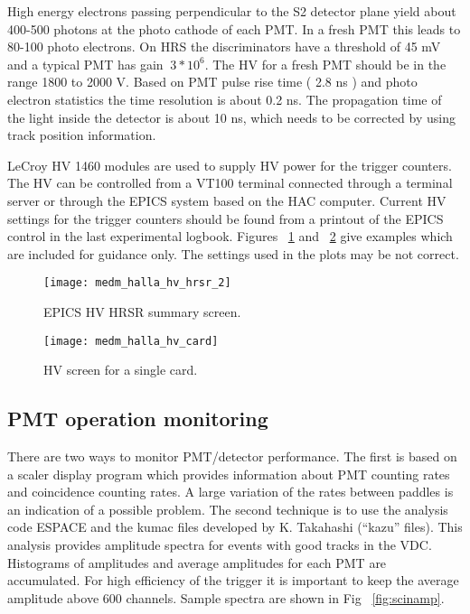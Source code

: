 High energy electrons passing perpendicular to the S2 detector
plane yield about 400-500 photons at the photo cathode of each
PMT. In a fresh PMT this leads to 80-100 
photo electrons. On HRS the discriminators have a threshold of 45
mV and a typical 
PMT has gain $~ 3*10^6$. The HV for a fresh PMT should be in the
range 1800 to 2000 V. Based on PMT pulse 
rise time ( 2.8 ns ) and photo electron statistics the time
resolution is about 0.2 ns. 
The propagation time of the light inside the detector is about 10 ns,
which needs to be corrected by using track position information. 

LeCroy HV 1460 modules are used to supply HV power for the
trigger counters. The HV can be controlled from 
a VT100 terminal connected through a terminal server or through
the EPICS system based on the HAC computer. 
Current HV settings for the trigger counters should be found from
a printout of the EPICS control in the 
last experimental logbook.   
Figures ~\ref{fig:scinhv} and ~\ref{fig:s1scinhvc} give examples
which are included for guidance only. The settings used in the
plots may be not correct.

\begin{figure}[p]
\begin{center}
\texttt{[image: medm\_halla\_hv\_hrsr\_2]}
{\linespread{1.}
\caption[Detectors: HV HRSR Summary Screen]{EPICS HV HRSR summary screen.}
\label{fig:scinhv}}
\end{center}
\end{figure}

\begin{figure}[p]
\begin{center}
\texttt{[image: medm\_halla\_hv\_card]}
{\linespread{1.}
\caption[Detectors: HV Screen for Single Card]{HV screen for a
single card.}
\label{fig:s1scinhvc}}
\end{center}
\end{figure}

\subsection{PMT operation monitoring}

There are two ways to monitor PMT/detector performance. The first
is based on a scaler display program which provides information
about PMT counting rates and coincidence counting rates.
A large variation of the rates between paddles
is an indication of a possible problem.
The second technique is to use the analysis code ESPACE and the
kumac files developed by K. Takahashi 
(``kazu'' files). This analysis provides amplitude spectra for
events with good tracks in the VDC.
Histograms of amplitudes and average amplitudes for each PMT are
accumulated. For high efficiency
of the trigger it is important to keep the average amplitude
above 600 channels. Sample spectra are shown in Fig ~\ref{fig:scinamp}.

